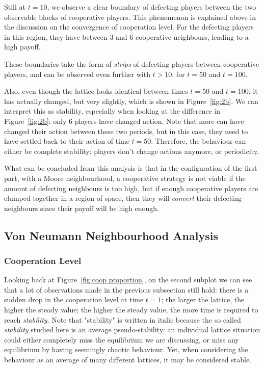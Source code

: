 \documentclass{article}
\begin{document}
Still at $t=10$, we observe a clear boundary of defecting players between the two observable blocks
of cooperative players. This phenomenon is explained above in the discussion on the convergence
of cooperation level. For the defecting players in this region, they have between 3 and 6 cooperative
neighbours, leading to a high payoff.

These boundaries take the form of \textit{strips} of defecting players between cooperative players,
and can be observed even further with $t > 10$: for $t=50$ and $t=100$.

Also, even though the lattice looks identical between times $t=50$ and $t=100$, it has actually changed,
but very slightly, which is shown in Figure~\ref{fig:2b}. We can interpret this as stability, especially
when looking at the difference in Figure~\ref{fig:2b}: only 6 players have changed action. Note that
more can have changed their action between these two periods, but in this case, they need to have settled
back to their action of time $t=50$. Therefore, the behaviour can either be complete stability: players
don't change actions anymore, or periodicity.

What can be concluded from this analysis is that in the configuration of the first part, with a Moore
neighbourhood, a cooperative strategy is not viable if the amount of defecting neighbours is too high,
but if enough cooperative players are clumped together in a region of space, then they will \textit{convert}
their defecting neighbours since their payoff will be high enough.

\subsection{Von Neumann Neighbourhood Analysis}

\subsubsection{Cooperation Level}

Looking back at Figure~\ref{fig:coop proportion}, on the second subplot we can see that a lot of observations
made in the previous subsection still hold: there is a sudden drop in the cooperation level at time
$t=1$; the larger the lattice, the higher the steady value; the higher the steady value, the more time
is required to reach \textit{stability}. Note that "stability" is written in italic because the so called
\textit{stability} studied here is an average pseudo-stability: an individual lattice situation could
either completely miss the equilibrium we are discussing, or miss any equilibrium by having seemingly
chaotic behaviour. Yet, when considering the behaviour as an average of many different lattices, it may
be considered stable.
\end{document}
